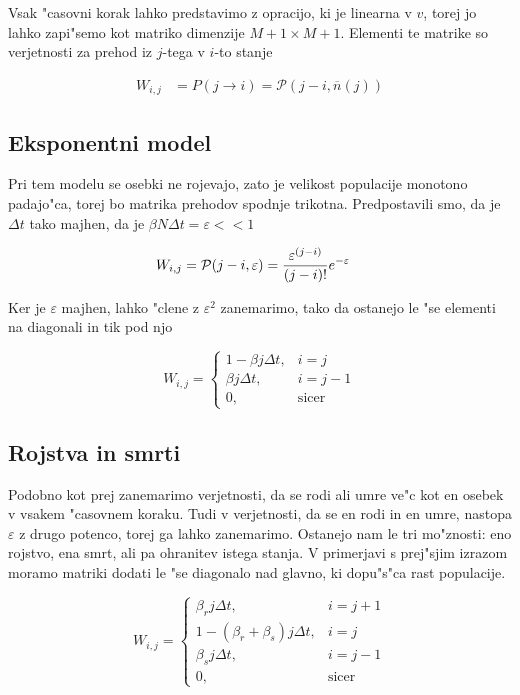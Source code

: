 \documentclass[a4paper,10pt]{article}
\newcommand{\eps}{\varepsilon}
\begin{document}
Vsak "casovni korak lahko predstavimo z opracijo, ki je linearna v $v$, torej jo lahko zapi"semo kot matriko dimenzije $M+1\times M+1$. Elementi te matrike so verjetnosti za prehod iz $j$-tega v $i$-to stanje

\begin{align}
W_{i,j} &= P(j\to i) = \mathcal P(j-i, \overline{n}(j))
\end{align}

\subsection{Eksponentni model}

Pri tem modelu se osebki ne rojevajo, zato je velikost populacije monotono padajo"ca, torej bo matrika prehodov spodnje trikotna. Predpostavili smo, da je $\Delta t$ tako majhen, da je $\beta N \Delta t = \eps << 1$

\begin{align}
  W_{i,j} &= \mathcal{P}(j-i, \eps) = \poisson{(j-i)}{\eps}
\end{align}

Ker je $\eps$ majhen, lahko "clene z $\eps^2$ zanemarimo, tako da ostanejo le "se elementi na diagonali in tik pod njo

\begin{equation}
  W_{i,j} = \left\{ \begin{matrix} 
		      1 - \beta j \Delta t, & i=j \\
                      \beta j \Delta t, & i=j-1 \\
		      0, & \mathrm{sicer}
                    \end{matrix}\right.
\end{equation}

\subsection{Rojstva in smrti}

Podobno kot prej zanemarimo verjetnosti, da se rodi ali umre ve"c kot en osebek v vsakem "casovnem koraku. Tudi v verjetnosti, da se en rodi in en umre, nastopa $\eps$ z drugo potenco, torej ga lahko zanemarimo. Ostanejo nam le tri mo"znosti: eno rojstvo, ena smrt, ali pa ohranitev istega stanja. V primerjavi s prej"sjim izrazom moramo matriki dodati le "se diagonalo nad glavno, ki dopu"s"ca rast populacije. 

\begin{equation}
  W_{i,j} = \left\{ \begin{matrix} 
                      \beta_r j \Delta t, & i=j+1 \\
		      1 - (\beta_r+\beta_s) j \Delta t, & i=j \\
                      \beta_s j \Delta t, & i=j-1 \\
		      0, & \mathrm{sicer}
                    \end{matrix}\right.
\end{equation}
\end{document}

